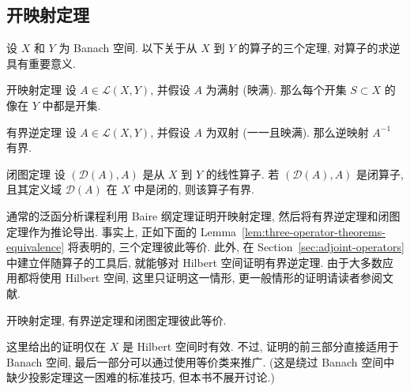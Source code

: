 \subsection{开映射定理}\label{sec:open-mapping-theorem}

设 $X$ 和 $Y$ 为 Banach 空间. 以下关于从 $X$ 到 $Y$ 的算子的三个定理, 对算子的求逆具有重要意义.

\begin{Theorem}{开映射定理}
\label{thm:open-mapping}
设 $A\in\mathcal{L}(X,Y)$, 并假设 $A$ 为满射 (映满). 那么每个开集 $S\subset X$ 的像在 $Y$ 中都是开集.
\end{Theorem}

\begin{Theorem}{有界逆定理}
\label{thm:bounded-inverse}
设 $A\in\mathcal{L}(X,Y)$, 并假设 $A$ 为双射 (一一且映满). 那么逆映射 $A^{-1}$ 有界.
\end{Theorem}

\begin{Theorem}{闭图定理}
\label{thm:closed-graph}
设 $(\mathcal{D}(A),A)$ 是从 $X$ 到 $Y$ 的线性算子. 若 $(\mathcal{D}(A),A)$ 是闭算子, 且其定义域 $\mathcal{D}(A)$ 在 $X$ 中是闭的, 则该算子有界.
\end{Theorem}

通常的泛函分析课程利用 Baire 纲定理证明开映射定理, 然后将有界逆定理和闭图定理作为推论导出. 事实上, 正如下面的 Lemma~\ref{lem:three-operator-theorems-equivalence} 将表明的, 三个定理彼此等价. 此外, 在 Section~\ref{sec:adjoint-operators} 中建立伴随算子的工具后, 就能够对 Hilbert 空间证明有界逆定理. 由于大多数应用都将使用 Hilbert 空间, 这里只证明这一情形, 更一般情形的证明请读者参阅文献.

\begin{Lemma}
\label{lem:three-operator-theorems-equivalence}
开映射定理, 有界逆定理和闭图定理彼此等价.
\end{Lemma}

这里给出的证明仅在 $X$ 是 Hilbert 空间时有效. 不过, 证明的前三部分直接适用于 Banach 空间, 最后一部分可以通过使用等价类来推广. (这是绕过 Banach 空间中缺少投影定理这一困难的标准技巧, 但本书不展开讨论.)

